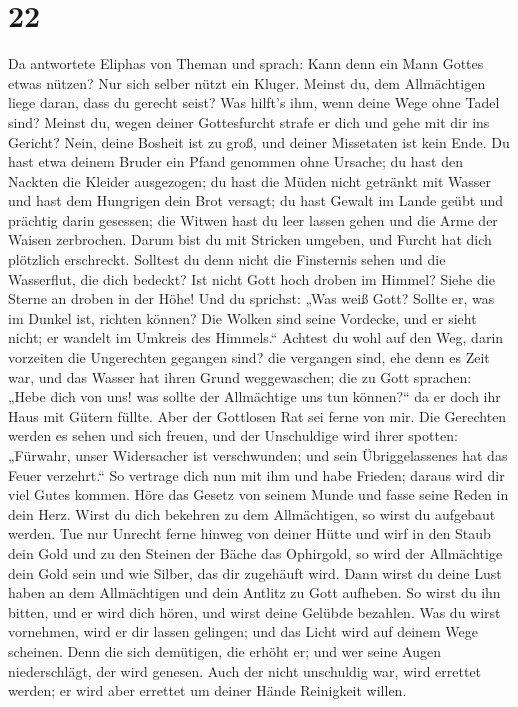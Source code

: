 \hypertarget{section-21}{%
\section{22}\label{section-21}}

 Da antwortete Eliphas von Theman und sprach:
 Kann denn ein Mann Gottes etwas nützen? Nur sich selber
nützt ein Kluger.  Meinst du, dem Allmächtigen liege
daran, dass du gerecht seist? Was hilft's ihm, wenn deine Wege ohne
Tadel sind?  Meinst du, wegen deiner Gottesfurcht strafe
er dich und gehe mit dir ins Gericht?  Nein, deine Bosheit
ist zu groß, und deiner Missetaten ist kein Ende.  Du hast
etwa deinem Bruder ein Pfand genommen ohne Ursache; du hast den Nackten
die Kleider ausgezogen;  du hast die Müden nicht getränkt
mit Wasser und hast dem Hungrigen dein Brot versagt;  du
hast Gewalt im Lande geübt und prächtig darin gesessen; 
die Witwen hast du leer lassen gehen und die Arme der Waisen zerbrochen.
 Darum bist du mit Stricken umgeben, und Furcht hat dich
plötzlich erschreckt.  Solltest du denn nicht die
Finsternis sehen und die Wasserflut, die dich bedeckt? 
Ist nicht Gott hoch droben im Himmel? Siehe die Sterne an droben in der
Höhe!  Und du sprichst: „Was weiß Gott? Sollte er, was im
Dunkel ist, richten können?  Die Wolken sind seine
Vordecke, und er sieht nicht; er wandelt im Umkreis des Himmels.``
 Achtest du wohl auf den Weg, darin vorzeiten die
Ungerechten gegangen sind?  die vergangen sind, ehe denn
es Zeit war, und das Wasser hat ihren Grund weggewaschen;
 die zu Gott sprachen: „Hebe dich von uns! was sollte der
Allmächtige uns tun können?{}``  da er doch ihr Haus mit
Gütern füllte. Aber der Gottlosen Rat sei ferne von mir. 
Die Gerechten werden es sehen und sich freuen, und der Unschuldige wird
ihrer spotten:  „Fürwahr, unser Widersacher ist
verschwunden; und sein Übriggelassenes hat das Feuer verzehrt.``
 So vertrage dich nun mit ihm und habe Frieden; daraus
wird dir viel Gutes kommen.  Höre das Gesetz von seinem
Munde und fasse seine Reden in dein Herz.  Wirst du dich
bekehren zu dem Allmächtigen, so wirst du aufgebaut werden. Tue nur
Unrecht ferne hinweg von deiner Hütte  und wirf in den
Staub dein Gold und zu den Steinen der Bäche das Ophirgold,
 so wird der Allmächtige dein Gold sein und wie Silber,
das dir zugehäuft wird.  Dann wirst du deine Lust haben
an dem Allmächtigen und dein Antlitz zu Gott aufheben. 
So wirst du ihn bitten, und er wird dich hören, und wirst deine Gelübde
bezahlen.  Was du wirst vornehmen, wird er dir lassen
gelingen; und das Licht wird auf deinem Wege scheinen. 
Denn die sich demütigen, die erhöht er; und wer seine Augen
niederschlägt, der wird genesen.  Auch der nicht
unschuldig war, wird errettet werden; er wird aber errettet um deiner
Hände Reinigkeit willen.

